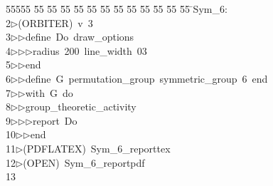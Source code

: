 %
%
\begin{tabbing}
55555 \= 55 \= 55 \= 55 \= 55 \= 55 \= 55 \= 55 \= 55 \= 55 \= 55 \= 55 \= 55 \= \>Sym\_6:\\[0pt]
2\>$\triangleright$\>(ORBITER)\ v\ 3\ \\[0pt]
3\>$\triangleright$\>$\triangleright$\>define\ Do\ draw\_options\ \\[0pt]
4\>$\triangleright$\>$\triangleright$\>$\triangleright$\>radius\ 200\ line\_width\ 03\ \\[0pt]
5\>$\triangleright$\>$\triangleright$\>end\ \\[0pt]
6\>$\triangleright$\>$\triangleright$\>define\ G\ permutation\_group\ symmetric\_group\ 6\ end\ \\[0pt]
7\>$\triangleright$\>$\triangleright$\>with\ G\ do\ \\[0pt]
8\>$\triangleright$\>$\triangleright$\>group\_theoretic\_activity\ \\[0pt]
9\>$\triangleright$\>$\triangleright$\>$\triangleright$\>report\ Do\ \\[0pt]
10\>$\triangleright$\>$\triangleright$\>end\\[0pt]
11\>$\triangleright$\>(PDFLATEX)\ Sym\_6\_reporttex\\[0pt]
12\>$\triangleright$\>(OPEN)\ Sym\_6\_reportpdf\\[0pt]
13\>\end{tabbing}
